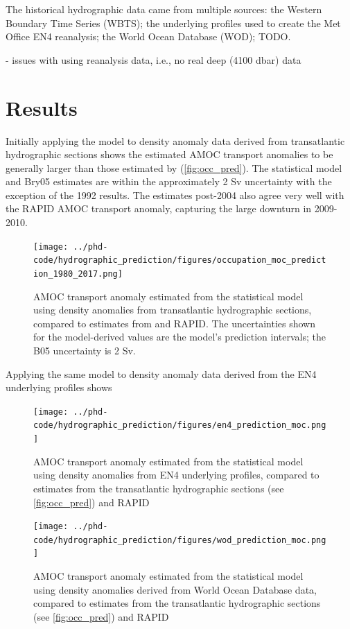 \documentclass[a4paper,fleqn]{cas-sc}
\begin{document}
The historical hydrographic data came from multiple sources: the Western Boundary Time Series (WBTS); the underlying profiles used to create the Met Office EN4 reanalysis; the World Ocean Database (WOD); TODO.

- issues with using reanalysis data, i.e., no real deep (4100 dbar) data


\section{Results}

Initially applying the model to density anomaly data derived from transatlantic hydrographic sections shows the estimated AMOC transport anomalies to be generally larger than those estimated by \citet{bryden2005} (\autoref{fig:occ_pred}). The statistical model and Bry05 estimates are within the approximately 2 Sv uncertainty with the exception of the 1992 results. The estimates post-2004 also agree very well with the RAPID AMOC transport anomaly, capturing the large downturn in 2009-2010.

\begin{figure}
	\centering
		\texttt{[image: ../phd-code/hydrographic\_prediction/figures/occupation\_moc\_prediction\_1980\_2017.png]}
	\caption{AMOC transport anomaly estimated from the statistical model using density anomalies from transatlantic hydrographic sections, compared to estimates from \citet{bryden2005} and RAPID. The uncertainties shown for the model-derived values are the model's prediction intervals; the B05 uncertainty is 2 Sv.}
	\label{fig:occ_pred}
\end{figure}

Applying the same model to density anomaly data derived from the EN4 underlying profiles shows 


\begin{figure}
	\centering
		\texttt{[image: ../phd-code/hydrographic\_prediction/figures/en4\_prediction\_moc.png]}
	\caption{AMOC transport anomaly estimated from the statistical model using density anomalies from EN4 underlying profiles, compared to estimates from the transatlantic hydrographic sections (see \autoref{fig:occ_pred}) and RAPID}
	\label{fig:en4_pred}
\end{figure}


\begin{figure}
	\centering
		\texttt{[image: ../phd-code/hydrographic\_prediction/figures/wod\_prediction\_moc.png]}
	\caption{AMOC transport anomaly estimated from the statistical model using density anomalies derived from World Ocean Database data, compared to estimates from the transatlantic hydrographic sections (see \autoref{fig:occ_pred}) and RAPID}
	\label{fig:wod_pred}
\end{figure}
\end{document}
